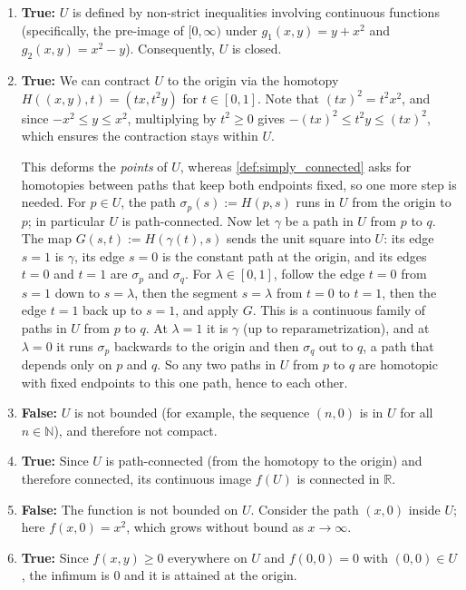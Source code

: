 \begin{exercisesolution}
\label{sol:topology_continuous_images_tf}
\begin{enumerate}[label=\textbf{(\alph*)}]
  \item \textbf{True:} $U$ is defined by non-strict inequalities involving continuous functions (specifically, the pre-image of $[0, \infty)$ under $g_1(x,y) = y+x^2$ and $g_2(x,y) = x^2-y$). Consequently, $U$ is closed.
  \item \textbf{True:} We can contract $U$ to the origin via the homotopy $H((x,y), t) = (tx, t^2y)$ for $t \in [0,1]$. Note that $(tx)^2 = t^2x^2$, and since $-x^2 \le y \le x^2$, multiplying by $t^2 \ge 0$ gives $-(tx)^2 \le t^2y \le (tx)^2$, which ensures the contraction stays within $U$.

    This deforms the \emph{points} of $U$, whereas \cref{def:simply_connected} asks for
    homotopies between paths that keep both endpoints fixed, so one more step is needed. For
    $p \in U$, the path $\sigma_p(s) := H(p,s)$ runs in $U$ from the origin to $p$; in particular
    $U$ is path-connected. Now let $\gamma$ be a path in $U$ from $p$ to $q$. The map
    $G(s,t) := H(\gamma(t),s)$ sends the unit square into $U$: its edge $s = 1$ is $\gamma$, its
    edge $s = 0$ is the constant path at the origin, and its edges $t = 0$ and $t = 1$ are
    $\sigma_p$ and $\sigma_q$. For $\lambda \in [0,1]$, follow the edge $t = 0$ from $s = 1$ down
    to $s = \lambda$, then the segment $s = \lambda$ from $t = 0$ to $t = 1$, then the edge $t = 1$
    back up to $s = 1$, and apply $G$. This is a continuous family of paths in $U$ from $p$ to
    $q$. At $\lambda = 1$ it is $\gamma$ (up to reparametrization), and at $\lambda = 0$ it runs
    $\sigma_p$ backwards to the origin and then $\sigma_q$ out to $q$, a path that depends only on
    $p$ and $q$. So any two paths in $U$ from $p$ to $q$ are homotopic with fixed endpoints to
    this one path, hence to each other.
  \item \textbf{False:} $U$ is not bounded (for example, the sequence $(n,0)$ is in $U$ for all $n \in \mathbb{N}$), and therefore not compact.
  \item \textbf{True:} Since $U$ is path-connected (from the homotopy to the origin) and therefore connected, its continuous image $f(U)$ is connected in $\mathbb{R}$.
  \item \textbf{False:} The function is not bounded on $U$. Consider the path $(x,0)$ inside $U$; here $f(x,0) = x^2$, which grows without bound as $x \to \infty$.
  \item \textbf{True:} Since $f(x,y) \ge 0$ everywhere on $U$ and $f(0,0) = 0$ with $(0,0) \in U$, the infimum is $0$ and it is attained at the origin.
\end{enumerate}
\end{exercisesolution}

